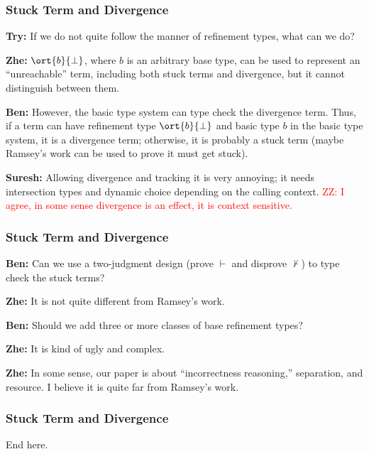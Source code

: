 \begin{frame}
    \frametitle{Stuck Term and Divergence}

\textbf{Try:} If we do not quite follow the manner of refinement types, what can we do?

\textbf{Zhe:} $\ort{b}{\bot}$, where $b$ is an arbitrary base type, can be used to represent an ``unreachable'' term, including both stuck terms and divergence, but it cannot distinguish between them.

\textbf{Ben:} However, the basic type system can type check the divergence term. Thus, if a term can have refinement type $\ort{b}{\bot}$ and basic type $b$ in the basic type system, it is a divergence term; otherwise, it is probably a stuck term (maybe Ramsey's work can be used to prove it must get stuck).

\textbf{Suresh:} Allowing divergence and tracking it is very annoying; it needs intersection types and dynamic choice depending on the calling context. \textcolor{red}{ZZ: I agree, in some sense divergence is an effect, it is context sensitive.}

\end{frame}

\begin{frame}
    \frametitle{Stuck Term and Divergence}

\textbf{Ben:} Can we use a two-judgment design (prove $\vdash$ and disprove $\nvdash$) to type check the stuck terms?

\textbf{Zhe:} It is not quite different from Ramsey's work.

\textbf{Ben:} Should we add three or more classes of base refinement types?

\textbf{Zhe:} It is kind of ugly and complex.

\textbf{Zhe:} In some sense, our paper is about ``incorrectness reasoning,'' separation, and resource. I believe it is quite far from Ramsey's work.

\end{frame}

\begin{frame}
    \frametitle{Stuck Term and Divergence}

End here.

\end{frame}


